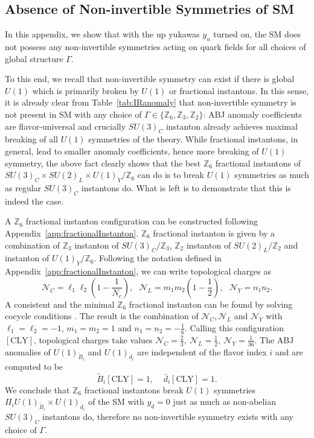 \documentclass[11pt,a4paper]{article}
\def\beq{\begin{equation}}
\def\eeq{\end{equation}}
\begin{document}
\subsection{Absence of Non-invertible Symmetries of SM}
\label{app:no_NIS_SM}

In this appendix, we show that with the up yukawas $y_u$ turned on, the SM does not possess any non-invertible symmetries acting on quark fields for all choices of global structure $\Gamma$. 

To this end, we recall that non-invertible symmetry can exist if there is global $U(1)$ which is primarily broken by $U(1)$ or fractional instantons. In this sense, it is already clear from Table~\ref{tab:IRanomaly} that non-invertible symmetry is not present in SM with any choice of $\Gamma \in \{ \mathbb{Z}_6, \mathbb{Z}_3, \mathbb{Z}_2 \}$: ABJ anomaly coefficients are flavor-universal and crucially $SU(3)_C$ instanton already achieves maximal breaking of all $U(1)$ symmetries of the theory. 
While fractional instantons, in general, lead to smaller anomaly coefficients, hence more breaking of $U(1)$ symmetry, the above fact clearly shows that the best $\mathbb{Z}_6$ fractional instantons of $SU(3)_C \times SU(2)_L \times U(1)_Y /\mathbb{Z}_6$ can do is to break $U(1)$ symmetries as much as regular $SU(3)_C$ instantons do. What is left is to demonstrate that this is indeed the case. 

A $\mathbb{Z}_6$ fractional instanton configuration can be constructed following Appendix~\ref{app:fractionalInstanton}. $\mathbb{Z}_6$ fractional instanton is given by a combination of $\mathbb{Z}_3$ instanton of $SU(3)_C / \mathbb{Z}_3$, $\mathbb{Z}_2$ instanton of $SU(2)_L / \mathbb{Z}_2$ and instanton of $U(1)_Y / \mathbb{Z}_6$. Following the notation defined in Appendix~\ref{app:fractionalInstanton}, we can write topological charges as
\begin{equation}
    \mathcal{N}_C = \ell_1 \ell_2 \left( 1 - \frac{1}{N_c} \right),~~~\mathcal{N}_L = m_1 m_2 \left( 1 - \frac{1}{2} \right),~~~\mathcal{N}_Y = n_1 n_2.
\end{equation}
A consistent and the minimal $\mathbb{Z}_6$ fractional instanton can be found by solving cocycle conditions \cite{Anber:2021iip}. The result is the combination of $\mathcal{N}_C, \mathcal{N}_L$ and $\mathcal{N}_Y$ with $\ell_1 = \ell_2 = -1$, $m_1 = m_2 = 1$ and $n_1 = n_2 = - \frac{1}{6}$. Calling this configuration $[\text{CLY}]$, topological charges take values $\mathcal{N}_C = \frac{2}{3},~ \mathcal{N}_L = \frac{1}{2},~ \mathcal{N}_Y = \frac{1}{36}$. The ABJ anomalies of $U(1)_{\tilde{B}_i}$ and $U(1)_{\bar{d}_i}$ are independent of the flavor index $i$ and are computed to be
%
\beq  
 \tilde{B}_i [\text{CLY}] = 1, \;\;\;\; \bar{d}_i [\text{CLY}] = 1.
\eeq 
%
We conclude that $\mathbb{Z}_6$ fractional instantons break $U(1)$ symmetries $\Pi_i U(1)_{\tilde{B}_i} \times U(1)_{\bar{d}_i}$ of the SM with $y_d = 0$ just as much as non-abelian $SU(3)_C$ instantons do, therefore no non-invertible symmetry exists with any choice of $\Gamma$.
\end{document}
